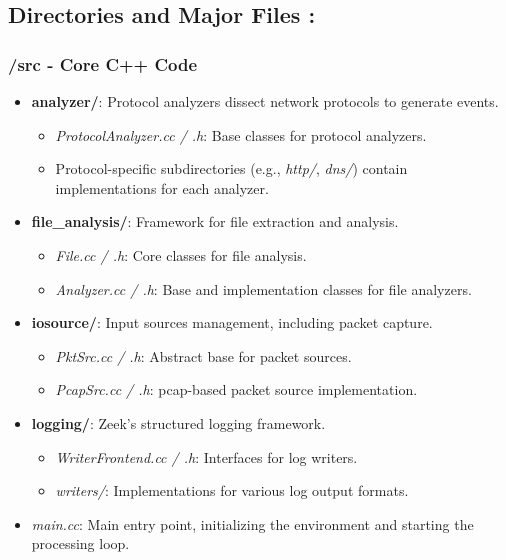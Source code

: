 \subsection{Directories and Major Files :}
\subsubsection{/src - Core C++ Code}
\begin{itemize}
    \item \textbf{analyzer/}: Protocol analyzers dissect network protocols to generate events.
    \begin{itemize}
        \item \emph{ProtocolAnalyzer.cc / .h}: Base classes for protocol analyzers.
        \item Protocol-specific subdirectories (e.g., \emph{http/}, \emph{dns/}) contain implementations for each analyzer.
    \end{itemize}

    \item \textbf{file\_analysis/}: Framework for file extraction and analysis.
    \begin{itemize}
        \item \emph{File.cc / .h}: Core classes for file analysis.
        \item \emph{Analyzer.cc / .h}: Base and implementation classes for file analyzers.
    \end{itemize}

    \item \textbf{iosource/}: Input sources management, including packet capture.
    \begin{itemize}
        \item \emph{PktSrc.cc / .h}: Abstract base for packet sources.
        \item \emph{PcapSrc.cc / .h}: pcap-based packet source implementation.
    \end{itemize}

    \item \textbf{logging/}: Zeek's structured logging framework.
    \begin{itemize}
        \item \emph{WriterFrontend.cc / .h}: Interfaces for log writers.
        \item \emph{writers/}: Implementations for various log output formats.
    \end{itemize}

    \item \emph{main.cc}: Main entry point, initializing the environment and starting the processing loop.
    

\end{itemize}
